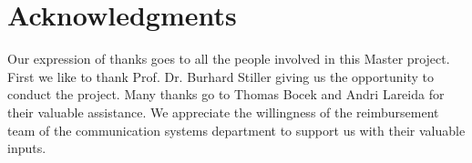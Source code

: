 \chapter*{Acknowledgments}

Our expression of thanks goes to all the people involved in this Master project. First we like to thank Prof. Dr. Burhard Stiller giving us the opportunity to conduct the project. Many thanks go to Thomas Bocek and Andri Lareida for their valuable assistance. We appreciate the willingness of the reimbursement team of the communication systems department to support us with their valuable inputs.